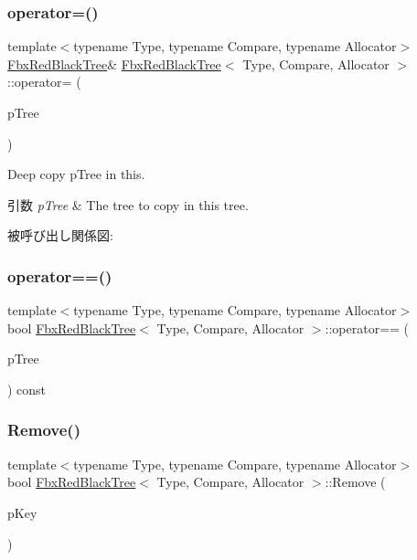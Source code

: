 \subsubsection{\texorpdfstring{operator=()}{operator=()}}
{\footnotesize\ttfamily template$<$typename Type, typename Compare, typename Allocator$>$ \\
\hyperlink{class_fbx_red_black_tree}{Fbx\+Red\+Black\+Tree}\& \hyperlink{class_fbx_red_black_tree}{Fbx\+Red\+Black\+Tree}$<$ Type, Compare, Allocator $>$\+::operator= (\begin{DoxyParamCaption}\item[{const \hyperlink{class_fbx_red_black_tree}{Fbx\+Red\+Black\+Tree}$<$ Type, Compare, Allocator $>$ \&}]{p\+Tree }\end{DoxyParamCaption})}

Deep copy p\+Tree in this. 
\begin{DoxyParams}{引数}
{\em p\+Tree} & The tree to copy in this tree. \\
\hline
\end{DoxyParams}
被呼び出し関係図\+:
\mbox{\label{class_fbx_red_black_tree_a40aebf09d104a56e1e6724ac7acb66b9}} 
\subsubsection{\texorpdfstring{operator==()}{operator==()}}
{\footnotesize\ttfamily template$<$typename Type, typename Compare, typename Allocator$>$ \\
bool \hyperlink{class_fbx_red_black_tree}{Fbx\+Red\+Black\+Tree}$<$ Type, Compare, Allocator $>$\+::operator== (\begin{DoxyParamCaption}\item[{const \hyperlink{class_fbx_red_black_tree}{Fbx\+Red\+Black\+Tree}$<$ Type, Compare, Allocator $>$ \&}]{p\+Tree }\end{DoxyParamCaption}) const}

\mbox{\label{class_fbx_red_black_tree_a432f0ed569c5ccb0273c583e59414b0b}} 
\subsubsection{\texorpdfstring{Remove()}{Remove()}}
{\footnotesize\ttfamily template$<$typename Type, typename Compare, typename Allocator$>$ \\
bool \hyperlink{class_fbx_red_black_tree}{Fbx\+Red\+Black\+Tree}$<$ Type, Compare, Allocator $>$\+::Remove (\begin{DoxyParamCaption}\item[{const \hyperlink{class_fbx_red_black_tree_a241b31c6972995417d193458b7bb27e2}{Key\+Type} \&}]{p\+Key }\end{DoxyParamCaption})}

